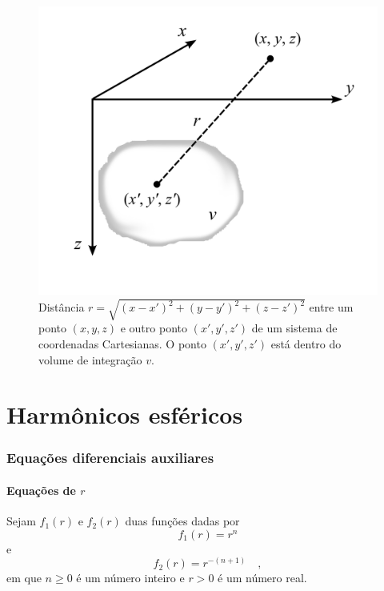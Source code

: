 \documentclass[10pt,a4paper,fleqn]{article}
\begin{document}
\begin{figure}[h]
    \centering
    \includegraphics[scale=1]{Figs/Fig1.png}
    \caption{Dist\^{a}ncia $r = \sqrt{(x-x')^{2}+(y-y')^{2}+(z-z')^{2}}$ entre
        um ponto $(x,y,z)$ e outro ponto $(x',y',z')$ de um sistema de coordenadas Cartesianas. O ponto
        $(x',y',z')$ est\'{a} dentro do volume de integra\c{c}\~{a}o $v$.}   
    \label{fig:fig1}
\end{figure}

\clearpage

\part{Harm\^{o}nicos esf\'{e}ricos}

\section{Equa\c{c}\~{o}es diferenciais auxiliares}

\subsection{Equa\c{c}\~{o}es de $r$}

Sejam $f_{1}(r)$ e $f_{2}(r)$ duas fun\c{c}\~{o}es dadas por
\begin{equation}
f_{1}(r) = r^{n}
\label{eq:ex211-r^}
\end{equation}
e
\begin{equation}
f_{2}(r) = r^{-(n+1)} \quad ,
\label{eq:ex211-r_}
\end{equation}
em que $n \geqslant 0$ \'{e} um n\'{u}mero inteiro e $r > 0$ \'{e} um n\'{u}mero real. 
\end{document}
